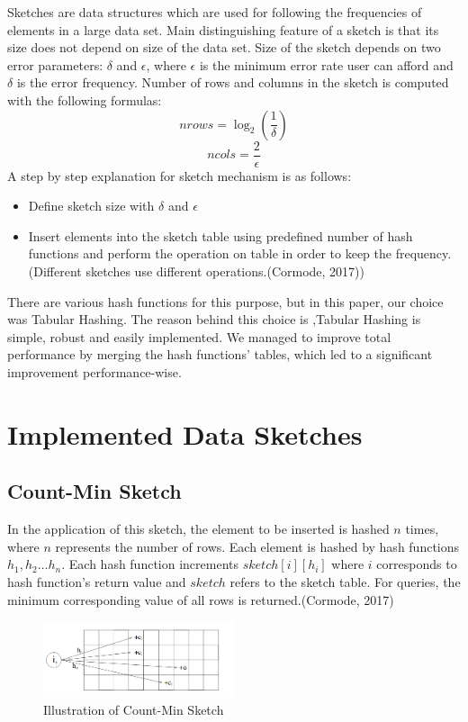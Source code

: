 \documentclass[twoside]{article}
\begin{document}
Sketches are data structures which are used for following the frequencies of elements in a large data set. Main distinguishing feature of a sketch is that its size does not depend on size of the data set. Size of the sketch depends on two error parameters: $\delta$ and $\epsilon$, where $\epsilon$ is the minimum error rate  user can afford
and $\delta$ is the error frequency. 
Number of rows and columns in the sketch is computed with the following formulas: $$nrows=\log_{2}(\frac{1}{\delta})$$ 
$$ncols=\frac{2}{\epsilon}$$
A step by step explanation for sketch mechanism is  as follows:
\begin{itemize}
\item Define sketch size with $\delta$ and $\epsilon$
\item Insert elements into the sketch table using predefined number of hash functions and perform the operation on table in order to keep the frequency. (Different sketches use different operations.(Cormode, 2017))

\end{itemize}
There are various hash functions for this purpose, but in this paper, our choice was Tabular Hashing. The reason behind this choice  is ,Tabular Hashing is simple, robust and easily implemented. We managed to improve total performance by merging the hash functions' tables, which led to a significant improvement performance-wise.
\section{Implemented Data Sketches}
\subsection{Count-Min Sketch}
In the application of this sketch, the element to be inserted is hashed $n$ times, where $n$ represents the number of rows. Each element is hashed by hash functions $h_{1},h_{2} \dots h_{n}$. Each hash function increments  $sketch[i][h_{i}]$ where $i$ corresponds to  hash function's return value and $sketch$ refers to the sketch table. For queries, the minimum corresponding value of all rows is returned.(Cormode, 2017)
\begin{figure}[H]
	\centering
	\includegraphics[width=0.5\textwidth]{Countmin.png}
	\caption{Illustration of Count-Min Sketch}
	

\end{figure}
\end{document}
